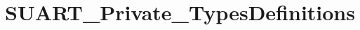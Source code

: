 \hypertarget{group___s_u_a_r_t___private___types_definitions}{}\section{S\+U\+A\+R\+T\+\_\+\+Private\+\_\+\+Types\+Definitions}
\label{group___s_u_a_r_t___private___types_definitions}

